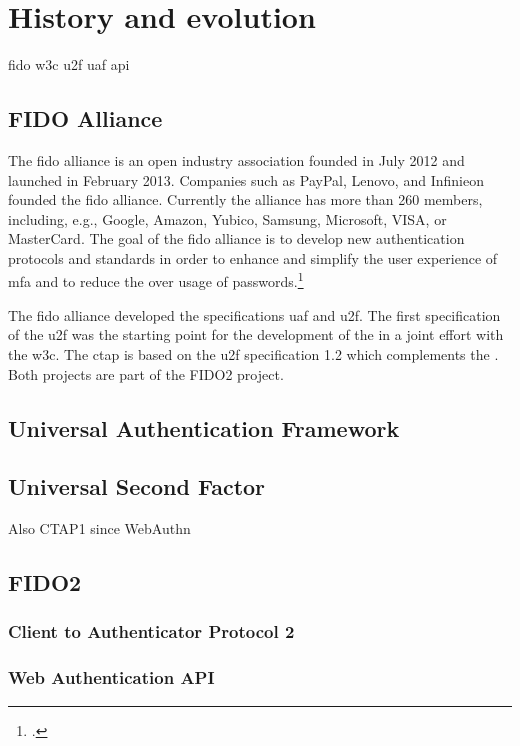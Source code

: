 
\section{History and evolution}

\gls{fido} \gls{w3c} \gls{u2f} \gls{uaf} \gls{api}

\subsection{FIDO Alliance}

The \gls{fido} alliance is an open industry association founded in July 2012 and launched in February 2013. Companies such as PayPal, Lenovo, and Infinieon founded the \gls{fido} alliance. Currently the alliance has more than 260 members, including, e.g., Google, Amazon, Yubico, Samsung, Microsoft, VISA, or MasterCard. The goal of the \gls{fido} alliance is to develop new authentication protocols and standards in order to enhance and simplify the user experience of \gls{mfa} and to reduce the over usage of passwords.\footcites[See][583]{eckert-it-sec-9}

The \gls{fido} alliance developed the specifications \gls{uaf} and \gls{u2f}. The first specification of the \gls{u2f} was the starting point for the development of the \wa{} in a joint effort with the \gls{w3c}. The \gls{ctap} is based on the \gls{u2f} specification 1.2 which complements the \wa. Both projects are part of the FIDO2 project.

\subsection{Universal Authentication Framework}

\subsection{Universal Second Factor}

Also CTAP1 since WebAuthn

\subsection{FIDO2}

\subsubsection{Client to Authenticator Protocol 2}

\subsubsection{Web Authentication API}